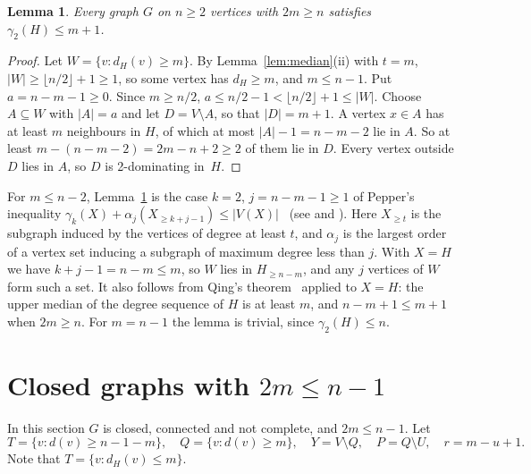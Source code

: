 \documentclass[11pt,a4paper]{article}
\newtheorem{lemma}[theorem]{Lemma}
\theoremstyle{remark}
\newcommand{\flr}[1]{\lfloor #1\rfloor}
\begin{document}
\begin{lemma}\label{lem:J}
Every graph $G$ on $n\ge 2$ vertices with $2m\ge n$ satisfies $\gamma_2(H)\le m+1$.
\end{lemma}

\begin{proof}
Let $W=\{v: d_H(v)\ge m\}$. By Lemma~\ref{lem:median}(ii) with $t=m$,
$|W|\ge\flr{n/2}+1\ge 1$, so some vertex has $d_H\ge m$, and $m\le n-1$. Put $a=n-m-1\ge 0$. Since
$m\ge n/2$, $a\le n/2-1<\flr{n/2}+1\le|W|$. Choose $A\subseteq W$ with $|A|=a$ and let
$D=V\setminus A$, so that $|D|=m+1$. A vertex $x\in A$ has at least $m$ neighbours in $H$, of
which at most $|A|-1=n-m-2$ lie in $A$. So at least $m-(n-m-2)=2m-n+2\ge 2$ of them lie in $D$.
Every vertex outside $D$ lies in $A$, so $D$ is 2-dominating in~$H$.
\end{proof}

For $m\le n-2$, Lemma~\ref{lem:J} is the case $k=2$, $j=n-m-1\ge 1$ of Pepper's inequality
$\gamma_k(X)+\alpha_j(X_{\ge k+j-1})\le |V(X)|$~\cite{pepper} (see \cite[Theorem 3(i)]{hp} and
\cite[Theorem 2.29]{hv}).
Here $X_{\ge t}$ is the subgraph induced by the vertices of degree at least $t$, and $\alpha_j$ is the
largest order of a vertex set inducing a subgraph of maximum degree less than $j$. With $X=H$ we
have $k+j-1=n-m\le m$, so $W$ lies in $H_{\ge n-m}$, and any $j$ vertices of $W$ form such a set. It also follows from Qing's theorem~\cite{qing} applied to $X=H$: the upper
median of the degree sequence of $H$ is at least $m$, and $n-m+1\le m+1$ when $2m\ge n$. For
$m=n-1$ the lemma is trivial, since $\gamma_2(H)\le n$.

\section{Closed graphs with \texorpdfstring{$2m\le n-1$}{2m <= n-1}}\label{sec:structure}

In this section $G$ is closed, connected and not complete, and $2m\le n-1$. Let
\[
  T=\{v: d(v)\ge n-1-m\},\quad Q=\{v: d(v)\ge m\},\quad Y=V\setminus Q,\quad P=Q\setminus U,
  \quad r=m-u+1 .
\]
Note that $T=\{v: d_H(v)\le m\}$.
\end{document}
